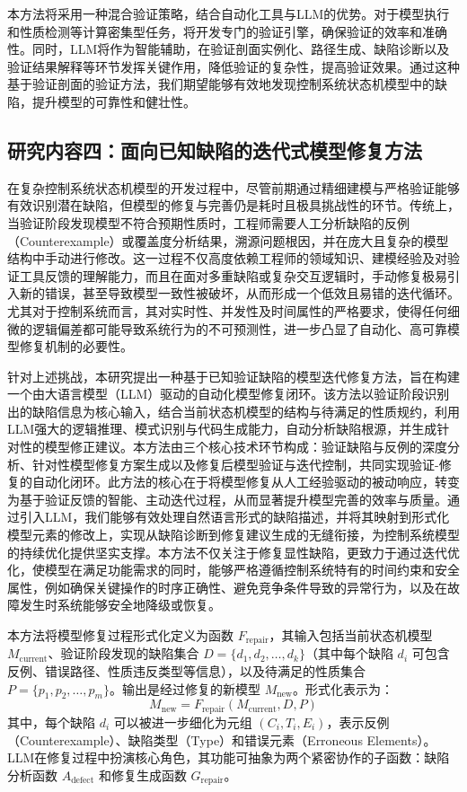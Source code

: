本方法将采用一种混合验证策略，结合自动化工具与LLM的优势。对于模型执行和性质检测等计算密集型任务，将开发专门的验证引擎，确保验证的效率和准确性。同时，LLM将作为智能辅助，在验证剖面实例化、路径生成、缺陷诊断以及验证结果解释等环节发挥关键作用，降低验证的复杂性，提高验证效果。通过这种基于验证剖面的验证方法，我们期望能够有效地发现控制系统状态机模型中的缺陷，提升模型的可靠性和健壮性。


\subsection{研究内容四：面向已知缺陷的迭代式模型修复方法}
\label{section-tech-fix}

在复杂控制系统状态机模型的开发过程中，尽管前期通过精细建模与严格验证能够有效识别潜在缺陷，但模型的修复与完善仍是耗时且极具挑战性的环节。传统上，当验证阶段发现模型不符合预期性质时，工程师需要人工分析缺陷的反例（Counterexample）或覆盖度分析结果，溯源问题根因，并在庞大且复杂的模型结构中手动进行修改。这一过程不仅高度依赖工程师的领域知识、建模经验及对验证工具反馈的理解能力，而且在面对多重缺陷或复杂交互逻辑时，手动修复极易引入新的错误，甚至导致模型一致性被破坏，从而形成一个低效且易错的迭代循环。尤其对于控制系统而言，其对实时性、并发性及时间属性的严格要求，使得任何细微的逻辑偏差都可能导致系统行为的不可预测性，进一步凸显了自动化、高可靠模型修复机制的必要性。

针对上述挑战，本研究提出一种基于已知验证缺陷的模型迭代修复方法，旨在构建一个由大语言模型（LLM）驱动的自动化模型修复闭环。该方法以验证阶段识别出的缺陷信息为核心输入，结合当前状态机模型的结构与待满足的性质规约，利用LLM强大的逻辑推理、模式识别与代码生成能力，自动分析缺陷根源，并生成针对性的模型修正建议。本方法由三个核心技术环节构成：验证缺陷与反例的深度分析、针对性模型修复方案生成以及修复后模型验证与迭代控制，共同实现验证-修复的自动化闭环。此方法的核心在于将模型修复从人工经验驱动的被动响应，转变为基于验证反馈的智能、主动迭代过程，从而显著提升模型完善的效率与质量。通过引入LLM，我们能够有效处理自然语言形式的缺陷描述，并将其映射到形式化模型元素的修改上，实现从缺陷诊断到修复建议生成的无缝衔接，为控制系统模型的持续优化提供坚实支撑。本方法不仅关注于修复显性缺陷，更致力于通过迭代优化，使模型在满足功能需求的同时，能够严格遵循控制系统特有的时间约束和安全属性，例如确保关键操作的时序正确性、避免竞争条件导致的异常行为，以及在故障发生时系统能够安全地降级或恢复。

本方法将模型修复过程形式化定义为函数 $F_{\text{repair}}$，其输入包括当前状态机模型 $M_{\text{current}}$、验证阶段发现的缺陷集合 $D = \{d_1, d_2, \dots, d_k\}$（其中每个缺陷 $d_i$ 可包含反例、错误路径、性质违反类型等信息），以及待满足的性质集合 $P = \{p_1, p_2, \dots, p_m\}$。输出是经过修复的新模型 $M_{\text{new}}$。形式化表示为：
\begin{equation}
M_{\text{new}} = F_{\text{repair}}(M_{\text{current}}, D, P)
\label{eq:repair_function}
\end{equation}
其中，每个缺陷 $d_i$ 可以被进一步细化为元组 $(C_i, T_i, E_i)$，表示反例（Counterexample）、缺陷类型（Type）和错误元素（Erroneous Elements）。LLM在修复过程中扮演核心角色，其功能可抽象为两个紧密协作的子函数：缺陷分析函数 $A_{\text{defect}}$ 和修复生成函数 $G_{\text{repair}}$。

